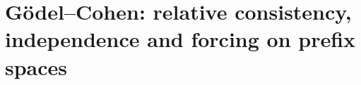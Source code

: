 \HMTFlushCurrentChapter
\chapter{Gödel--Cohen: relative consistency, independence and forcing on prefix spaces}%
\begingroup
\renewcommand{\chapter}[2][]{}%
%
\endgroup

\HMTFlushCurrentChapter
\chapter{Euler operatorial system in HMT: sum--product defect, triadic exponential geometries, Ambivalence Principle, and double projection}













\HMTFlushCurrentChapter
